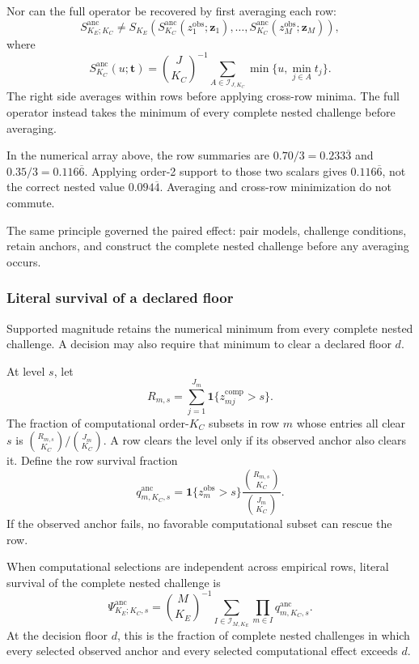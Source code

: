 \documentclass[11pt]{article}
\newcommand{\Sanc}{S^{\mathrm{anc}}}
\newcommand{\Psianc}{\Psi^{\mathrm{anc}}}
\theoremstyle{remark}
\begin{document}
Nor can the full operator be recovered by first averaging each row:
\begin{equation}
\Sanc_{K_E;K_C}
\ne
S_{K_E}\!\left(
\Sanc_{K_C}(z_1^{\mathrm{obs}};\mathbf z_1),
\ldots,
\Sanc_{K_C}(z_M^{\mathrm{obs}};\mathbf z_M)
\right),
\label{eq:row-noncomposition}
\end{equation}
where
\[
\Sanc_{K_C}(u;\mathbf t)
=
\binom{J}{K_C}^{-1}
\sum_{A\in\mathcal I_{J,K_C}}
\min\{u,\min_{j\in A}t_j\}.
\]
The right side averages within rows before applying cross-row minima. The full
operator instead takes the minimum of every complete nested challenge before
averaging.

In the numerical array above, the row summaries are
$0.70/3=0.233\overline3$ and $0.35/3=0.116\overline6$. Applying order-2
support to those two scalars gives $0.116\overline6$, not the correct nested
value $0.094\overline4$. Averaging and cross-row minimization do not commute.

The same principle governed the paired effect: pair models, challenge
conditions, retain anchors, and construct the complete nested challenge before
any averaging occurs.

\subsubsection{Literal survival of a declared floor}

Supported magnitude retains the numerical minimum from every complete nested
challenge. A decision may also require that minimum to clear a declared floor
$d$.

At level $s$, let
\[
R_{m,s}
=
\sum_{j=1}^{J_m}
\mathbf 1\{z_{mj}^{\mathrm{comp}}>s\}.
\]
The fraction of computational order-$K_C$ subsets in row $m$ whose entries all
clear $s$ is
$\binom{R_{m,s}}{K_C}/\binom{J_m}{K_C}$. A row clears the level only if its
observed anchor also clears it. Define the row survival fraction
\begin{equation}
q^{\mathrm{anc}}_{m,K_C,s}
=
\mathbf 1\{z_m^{\mathrm{obs}}>s\}
\frac{\binom{R_{m,s}}{K_C}}
{\binom{J_m}{K_C}}.
\label{eq:row-survival}
\end{equation}
If the observed anchor fails, no favorable computational subset can rescue the
row.

When computational selections are independent across empirical rows, literal
survival of the complete nested challenge is
\begin{equation}
\Psianc_{K_E;K_C,s}
=
\binom{M}{K_E}^{-1}
\sum_{I\in\mathcal I_{M,K_E}}
\prod_{m\in I}q^{\mathrm{anc}}_{m,K_C,s}.
\label{eq:anchored-survival}
\end{equation}
At the decision floor $d$, this is the fraction of complete nested challenges
in which every selected observed anchor and every selected computational
effect exceeds $d$.
\end{document}
